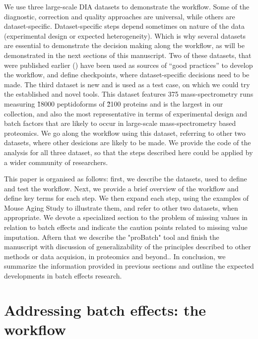 \documentclass[num-refs]{wiley-article}
\begin{document}
We use three large-scale DIA datasets to demonstrate the workflow. Some of the diagnostic, correction and quality approaches are universal, while others are dataset-specific. Dataset-specific steps depend sometimes on nature of the data (experimental design or expected heterogeneity). Which is why several datasets are essential to demonstrate the decision making along the workflow, as will be demonstrated in the next sections of this manuscript. Two of these datasets, that were published earlier (\cite{Collins2017, Sajic2018}) have been used as sources of “good practices” to develop the workflow, and define checkpoints, where dataset-specific decisions need to be made. The third dataset is new and is used as a test case, on which we could try the established and novel tools. This dataset features 375 mass-spectrometry runs measuring \~ 18000 peptidoforms of \~2100 proteins and is the largest in our collection, and also the most representative in terms of experimental design and batch factors that are likely to occur in large-scale mass-spectrometry based proteomics. We go along the workflow using this dataset, referring to other two datasets, where other desicions are likely to be made. We provide the code of the analysis for all three dataset, so that the steps described here could be applied by a wider community of researchers.

This paper is organised as follows: first, we describe the datasets, used to define and test the workflow. Next, we provide a brief overview of the workflow and define key terms for each step. We then expand each step, using the examples of Mouse Aging Study to illustrate them, and refer to other two datasets, when appropriate. We devote a specialized section to the problem of missing values in relation to batch effects and indicate the caution points related to missing value imputation. Aftern that we describe the "proBatch" tool and finish the manuscript with discussion of generalizability of the principles described to other methods or data acquision, in proteomics and beyond.. In conclusion, we summarize the information provided in previous sections and outline the expected developments in batch effects research.

\section{Addressing batch effects: the workflow}
\end{document}
